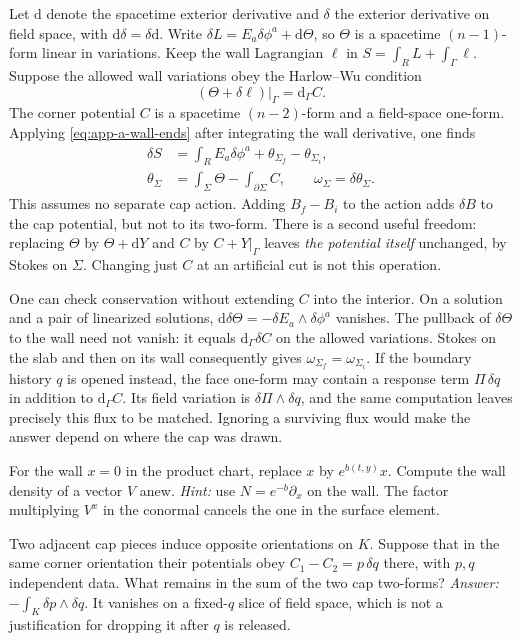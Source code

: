 Let $\mathrm{d}$ denote the spacetime exterior derivative and $\delta$ the exterior derivative on field space, with $\mathrm{d}\delta=\delta\mathrm{d}$. Write $\delta L=E_a\delta\phi^a+\mathrm{d}\Theta$, so $\Theta$ is a spacetime $(n-1)$-form linear in variations. Keep the wall Lagrangian $\ell$ in $S=\int_R L+\int_\Gamma\ell$. Suppose the allowed wall variations obey the Harlow--Wu condition \cite[eqs.~(2.20)--(2.27)]{HW}
\[
 (\Theta+\delta\ell)|_\Gamma=\mathrm{d}_\Gamma C .
\]
The corner potential $C$ is a spacetime $(n-2)$-form and a field-space one-form. Applying \eqref{eq:app-a-wall-ends} after integrating the wall derivative, one finds
\begin{equation}
 \begin{aligned}
  \delta S&=\int_R E_a\delta\phi^a+\theta_{\Sigma_f}-\theta_{\Sigma_i},\\
  \theta_\Sigma&=\int_\Sigma\Theta-\int_{\partial\Sigma}C,
  \qquad \omega_\Sigma=\delta\theta_\Sigma .
 \end{aligned}
 \label{eq:app-a-cap-potential}
\end{equation}
This assumes no separate cap action. Adding $B_f-B_i$ to the action adds $\delta B$ to the cap potential, but not to its two-form. There is a second useful freedom: replacing $\Theta$ by $\Theta+\mathrm{d}Y$ and $C$ by $C+Y|_\Gamma$ leaves \emph{the potential itself} unchanged, by Stokes on $\Sigma$. Changing just $C$ at an artificial cut is not this operation.

One can check conservation without extending $C$ into the interior. On a solution and a pair of linearized solutions, $\mathrm{d}\delta\Theta=-\delta E_a\wedge\delta\phi^a$ vanishes. The pullback of $\delta\Theta$ to the wall need not vanish: it equals $\mathrm{d}_\Gamma\delta C$ on the allowed variations. Stokes on the slab and then on its wall consequently gives $\omega_{\Sigma_f}=\omega_{\Sigma_i}$. If the boundary history $q$ is opened instead, the face one-form may contain a response term $\Pi\,\delta q$ in addition to $\mathrm{d}_\Gamma C$. Its field variation is $\delta\Pi\wedge\delta q$, and the same computation leaves precisely this flux to be matched. Ignoring a surviving flux would make the answer depend on where the cap was drawn.

\begin{exercise}
For the wall $x=0$ in the product chart, replace $x$ by $e^{b(t,y)}x$. Compute the wall density of a vector $V$ anew. \emph{Hint:} use $N=e^{-b}\partial_x$ on the wall. The factor multiplying $V^x$ in the conormal cancels the one in the surface element.
\end{exercise}

\begin{exercise}
Two adjacent cap pieces induce opposite orientations on $K$. Suppose that in the same corner orientation their potentials obey $C_1-C_2=p\,\delta q$ there, with $p,q$ independent data. What remains in the sum of the two cap two-forms? \emph{Answer:} $-\int_K\delta p\wedge\delta q$. It vanishes on a fixed-$q$ slice of field space, which is not a justification for dropping it after $q$ is released.
\end{exercise}
